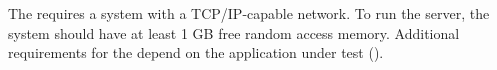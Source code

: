 The \gdagent requires a system with a TCP/IP-capable network. To run the server, the system should have at least 1 GB free random access memory. Additional requirements for the \gdagent depend on the application under test (\gdaut{}).
